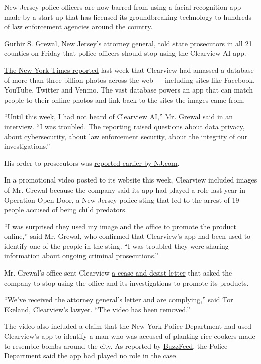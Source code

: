 New Jersey police officers are now barred from using a facial
recognition app made by a start-up that has licensed its groundbreaking
technology to hundreds of law enforcement agencies around the country.

Gurbir S. Grewal, New Jersey's attorney general, told state prosecutors
in all 21 counties on Friday that police officers should stop using the
Clearview AI app.

\href{https://www.nytimes3xbfgragh.onion/2020/01/18/technology/clearview-privacy-facial-recognition.html}{The
New York Times reported} last week that Clearview had amassed a database
of more than three billion photos across the web --- including sites
like Facebook, YouTube, Twitter and Venmo. The vast database powers an
app that can match people to their online photos and link back to the
sites the images came from.

``Until this week, I had not heard of Clearview AI,'' Mr. Grewal said in
an interview. ``I was troubled. The reporting raised questions about
data privacy, about cybersecurity, about law enforcement security, about
the integrity of our investigations.''

His order to prosecutors was
\href{https://www.nj.com/news/2020/01/new-jersey-cops-told-to-halt-all-use-of-controversial-facial-recognition-technology.html}{reported
earlier by NJ.com}.

In a promotional video posted to its website this week, Clearview
included images of Mr. Grewal because the company said its app had
played a role last year in Operation Open Door, a New Jersey police
sting that led to the arrest of 19 people accused of being child
predators.

``I was surprised they used my image and the office to promote the
product online,'' said Mr. Grewal, who confirmed that Clearview's app
had been used to identify one of the people in the sting. ``I was
troubled they were sharing information about ongoing criminal
prosecutions.''

Mr. Grewal's office sent Clearview
\href{https://int.graylady3jvrrxbe.onion/data/documenthelper/6726-new-jersey-ag-clearview-cease-/07b7d49c8810740df2cb/optimized/full.pdf\#page=1}{a
cease-and-desist letter} that asked the company to stop using the office
and its investigations to promote its products.

``We've received the attorney general's letter and are complying,'' said
Tor Ekeland, Clearview's lawyer. ``The video has been removed.''

The video also included a claim that the New York Police Department had
used Clearview's app to identify a man who was accused of planting rice
cookers made to resemble bombs around the city. As reported by
\href{https://www.buzzfeednews.com/article/ryanmac/clearview-ai-nypd-facial-recognition}{BuzzFeed},
the Police Department said the app had played no role in the case.

